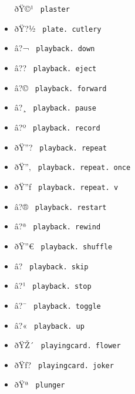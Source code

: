 \begin{itemize}
  \label{symbol-plaster}{{ ðŸ©¹ } \texttt{\ plaster\ }}
\item
  \label{symbol-plate.cutlery}{{ ðŸ?½ }
  \texttt{\ plate.\ cutlery\ }}
\item
  \label{symbol-playback.down}{{ â?¬ }
  \texttt{\ playback.\ down\ }}
\item
  \label{symbol-playback.eject}{{ â?? }
  \texttt{\ playback.\ eject\ }}
\item
  \label{symbol-playback.forward}{{ â?© }
  \texttt{\ playback.\ forward\ }}
\item
  \label{symbol-playback.pause}{{ â?¸ }
  \texttt{\ playback.\ pause\ }}
\item
  \label{symbol-playback.record}{{ â?º }
  \texttt{\ playback.\ record\ }}
\item
  \label{symbol-playback.repeat}{{ ðŸ''? }
  \texttt{\ playback.\ repeat\ }}
\item
  \label{symbol-playback.repeat.once}{{ ðŸ''‚ }
  \texttt{\ playback.\ repeat.\ once\ }}
\item
  \label{symbol-playback.repeat.v}{{ ðŸ''ƒ }
  \texttt{\ playback.\ repeat.\ v\ }}
\item
  \label{symbol-playback.restart}{{ â?® }
  \texttt{\ playback.\ restart\ }}
\item
  \label{symbol-playback.rewind}{{ â?ª }
  \texttt{\ playback.\ rewind\ }}
\item
  \label{symbol-playback.shuffle}{{ ðŸ''€ }
  \texttt{\ playback.\ shuffle\ }}
\item
  \label{symbol-playback.skip}{{ â?­ }
  \texttt{\ playback.\ skip\ }}
\item
  \label{symbol-playback.stop}{{ â?¹ }
  \texttt{\ playback.\ stop\ }}
\item
  \label{symbol-playback.toggle}{{ â?¯ }
  \texttt{\ playback.\ toggle\ }}
\item
  \label{symbol-playback.up}{{ â?« }
  \texttt{\ playback.\ up\ }}
\item
  \label{symbol-playingcard.flower}{{ ðŸŽ´ }
  \texttt{\ playingcard.\ flower\ }}
\item
  \label{symbol-playingcard.joker}{{ ðŸƒ? }
  \texttt{\ playingcard.\ joker\ }}
\item
  \label{symbol-plunger}{{ ðŸª } \texttt{\ plunger\ }}

\end{itemize}

